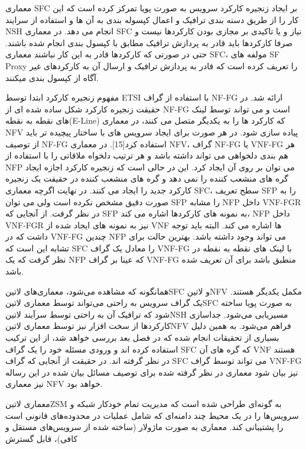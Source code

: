 معماری SFC بر ایجاد زنجیره کارکرد سرویس به صورت پویا تمرکز کرده است که این کار را از طریق دسته بندی ترافیک و اعمال کپسوله بندی به آن ها و استفاده از سرایند NSH انجام می دهد. در معماری SFC نیاز و یا تاکیدی بر مجازی بودن کارکردها نیست و صرفا کارکردها باید قادر به پردازش ترافیک مطابق با کپسول بندی انجام شده باشند. حتی در صورتی که کارکردها قادر به این کار نباشند معماری SFC، مولفه های SF Proxy را تعریف کرده است که قادر به پردازش ترافیک و ارسال آن به کارکردهای غیر آگاه از کپسول بندی میکنند.

مفهوم زنجیره کارکرد ابتدا توسط ETSI با استفاده از گراف NF-FG ارائه شد. در حقیقت زنجیره کارکرد شکل ساده شده ای از NF-FG است و می تواند توسط لینک های نقطه به نقطه(E-Line) که کارکرد ها را به یکدیگر متصل می کنند، در معماری NFV پیاده سازی شود. در هر صورت برای ایجاد سرویس های با ساختار پیچیده تر باید از توصیف NF-FG استفاده کرد[15]. در معماری NFV، گراف NF-FG یا VNF-FG هر هم بندی دلخواهی می تواند داشته باشد و هر ترتیب دلخواه ملاقاتی را با استفاده از NFP می توان بر روی آن ایجاد کرد. این در حالی است که زنجیره کارکرد اجازه ایجاد گره های منشعب کننده را نمی دهد و گره های منشعب کننده در حقیقت یک زنجیره کارکرد جدید را ایجاد می کنند. در نهایت اگرچه معماری SFC، سطح تعریف SFP را به صورت دقیق مشخص نکرده است ولی می توان SFP را مشابه NFP داخل VNF-FGR در نظر گرفت. از آنجایی که SFP به نمونه های کارکردها اشاره می کند، NFP داخل VNF-FGR نیز به نمونه های ایجاد شده از VNF ها اشاره می کند. البته باید توجه داشت که در VNF-FG چندین NFP می تواند وجود داشته باشد. بهترین حالت برای تشابه این است که SFC را معادل یک گراف VNF-FG با لینک های نقطه به نقطه در نظر گرفت که یک NFP که عینا بر گراف VNF-FG منطبق باشد برای آن تعریف شده باشد.

همانگونه که مشاهده می‌شود، معماری‌های ‌لاتین{SFC}
و ‌لاتین{NFV} مکمل یکدیگر هستند.
یک گراف سرویس به راحتی می‌تواند توسط معماری ‌لاتین{SFC} به صورت پویا ساخته شود
که ترافیک آن به راحتی توسط سرآیند ‌لاتین{NSH} مسیریابی می‌شود.
جداسازی کارکردها از سخت افزار نیز توسط معماری ‌لاتین{NFV} فراهم می‌شود.
به همین دلیل بسیاری از تحقیقات انجام شده که در فصل بعد بررسی خواهد شد، از این ترکیب استفاده کرده اند و ورودی مسئله خود را یک گراف SFC که گره های آن VNF هستند در نظر گرفته اند. در حقیقت از آنجایی که گراف SFC می تواند توسط گراف VNF-FG نیز بیان شود معماری در نظر گرفته شده برای توصیف مسائل بیان شده در این رساله نیز معماری NFV خواهد بود.


معماری ‌لاتین{ZSM} به گونه‌ای طراحی شده است که مدیریت تمام خودکار شبکه و سرویس‌ها را در یک محیط چند دامنه‌ای که شامل عملیات در محدوده‌های قانونی است را پشتیبانی کند.
معماری به صورت ماژولار (ساخته شده از سرویس‌های مستقل و کافی)، قابل گسترش

